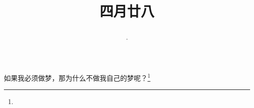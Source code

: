 \title{\date[d=4,m=6,y=2024][year:cn-y,年,month:cn,day:cn,日,·,weekday]·四月廿八 }
如果我必须做梦，那为什么不做我自己的梦呢？\footnote{ }

